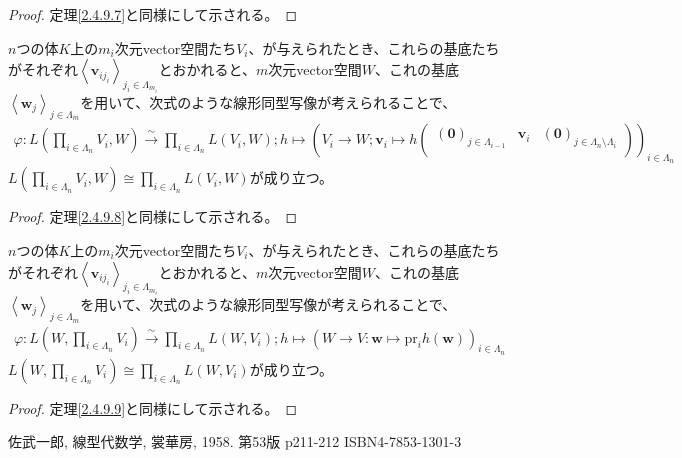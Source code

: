 \documentclass[dvipdfmx]{jsarticle}
\begin{document}
\begin{proof} 定理\ref{2.4.9.7}と同様にして示される。
\end{proof}
\begin{thm}\label{2.4.9.16}
$n$つの体$K$上の$m_{i}$次元vector空間たち$V_{i}$、が与えられたとき、これらの基底たちがそれぞれ$\left\langle \mathbf{v}_{ij_{i}} \right\rangle_{j_{i} \in \varLambda_{m_{i}}}$とおかれると、$m$次元vector空間$W$、これの基底$\left\langle \mathbf{w}_{j} \right\rangle_{j \in \varLambda_{m}}$を用いて、次式のような線形同型写像が考えられることで、
\begin{align*}
\varphi:L\left( \prod_{i \in \varLambda_{n}} V_{i},W \right)\overset{\sim}{\rightarrow}\prod_{i \in \varLambda_{n}} {L\left( V_{i},W \right)};h \mapsto \left( V_{i} \rightarrow W;\mathbf{v}_{i} \mapsto h\begin{pmatrix}
\left( \mathbf{0} \right)_{j \in \varLambda_{i - 1}} & \mathbf{v}_{i} & \left( \mathbf{0} \right)_{j \in \varLambda_{n} \setminus \varLambda_{i}} \\
\end{pmatrix} \right)_{i \in \varLambda_{n}}
\end{align*}
$L\left( \prod_{i \in \varLambda_{n}} V_{i},W \right) \cong \prod_{i \in \varLambda_{n}} {L\left( V_{i},W \right)}$が成り立つ。
\end{thm}
\begin{proof} 定理\ref{2.4.9.8}と同様にして示される。
\end{proof}
\begin{thm}\label{2.4.9.17}
$n$つの体$K$上の$m_{i}$次元vector空間たち$V_{i}$、が与えられたとき、これらの基底たちがそれぞれ$\left\langle \mathbf{v}_{ij_{i}} \right\rangle_{j_{i} \in \varLambda_{m_{i}}}$とおかれると、$m$次元vector空間$W$、これの基底$\left\langle \mathbf{w}_{j} \right\rangle_{j \in \varLambda_{m}}$を用いて、次式のような線形同型写像が考えられることで、
\begin{align*}
\varphi:L\left( W,\prod_{i \in \varLambda_{n}} V_{i} \right)\overset{\sim}{\rightarrow}\prod_{i \in \varLambda_{n}} {L\left( W,V_{i} \right)};h \mapsto \left( W \rightarrow V:\mathbf{w} \mapsto \mathrm{pr}_{i}{h\left( \mathbf{w} \right)} \right)_{i \in \varLambda_{n}}
\end{align*}
$L\left( W,\prod_{i \in \varLambda_{n}} V_{i} \right) \cong \prod_{i \in \varLambda_{n}} {L\left( W,V_{i} \right)}$が成り立つ。
\end{thm}
\begin{proof} 定理\ref{2.4.9.9}と同様にして示される。
\end{proof}
\begin{thebibliography}{50}
  佐武一郎, 線型代数学, 裳華房, 1958. 第53版 p211-212 ISBN4-7853-1301-3
\end{thebibliography}
\end{document}
